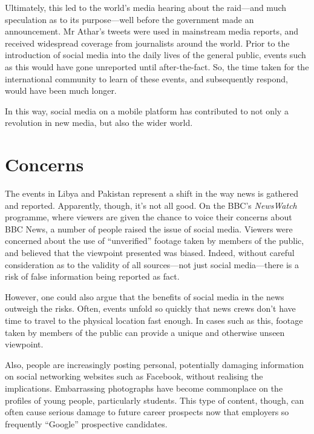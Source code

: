 \documentclass[a4paper,11pt]{article}
\begin{document}
    Ultimately, this led to the world's media hearing about the raid---and much
    speculation as to its purpose---well before the government made an
    announcement. Mr Athar's tweets were used in mainstream media reports, and
    received widespread coverage from journalists around the world. Prior to
    the introduction of social media into the daily lives of the general
    public, events such as this would have gone unreported until
    after-the-fact. So, the time taken for the international community to learn
    of these events, and subsequently respond, would have been much longer.

    In this way, social media on a mobile platform has contributed to not only
    a revolution in new media, but also the wider world.

    \section{Concerns}

    The events in Libya and Pakistan represent a shift in the way news is
    gathered and reported.  Apparently, though, it's not all good. On the BBC's
    \emph{NewsWatch} programme, where viewers are given the chance to voice
    their concerns about BBC News, a number of people raised the issue of
    social media. Viewers were concerned about the use of ``unverified''
    footage taken by members of the public, and believed that the viewpoint
    presented was biased. Indeed, without careful consideration as to the
    validity of all sources---not just social media---there is a risk of false
    information being reported as fact.

    However, one could also argue that the benefits of social media in the news
    outweigh the risks. Often, events unfold so quickly that news crews don't
    have time to travel to the physical location fast enough. In cases such as
    this, footage taken by members of the public can provide a unique and
    otherwise unseen viewpoint.

    Also, people are increasingly posting personal, potentially damaging
    information on social networking websites such as Facebook, without
    realising the implications. Embarrassing photographs have become
    commonplace on the profiles of young people, particularly students. This
    type of content, though, can often cause serious damage to future career
    prospects now that employers so frequently ``Google'' prospective
    candidates.
\end{document}
